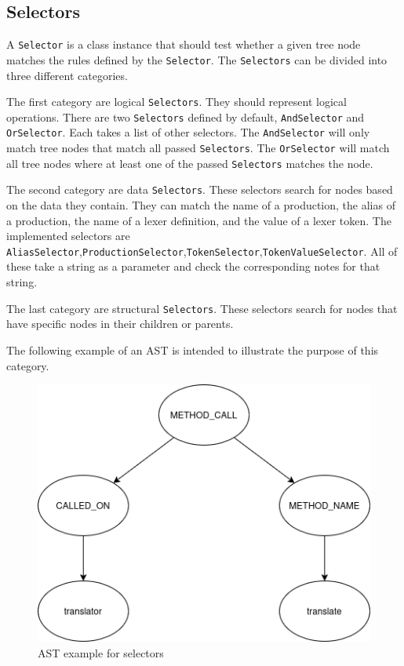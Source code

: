 
\subsection{Selectors}

A \verb|Selector| is a class instance that should test whether a given tree node matches the rules defined by the \verb|Selector|. 
The \verb|Selectors| can be divided into three different categories.

The first category are logical \verb|Selectors|. They should represent logical operations. 
There are two \verb|Selectors| defined by default, \verb|AndSelector| and \verb|OrSelector|. 
Each takes a list of other selectors. The \verb|AndSelector| will only match tree nodes that match all passed \verb|Selectors|. 
The \verb|OrSelector| will match all tree nodes where at least one of the passed \verb|Selectors| matches the node.


The second category are data \verb|Selectors|. 
These selectors search for nodes based on the data they contain. 
They can match the name of a production, the alias of a production, the name of a lexer definition, and the value of a lexer token. 
The implemented selectors are \verb|AliasSelector|,\verb|ProductionSelector|,\verb|TokenSelector|,\verb|TokenValueSelector|. 
All of these take a string as a parameter and check the corresponding notes for that string.


The last category are structural \verb|Selectors|. 
These selectors search for nodes that have specific nodes in their children or parents.

The following example of an AST is intended to illustrate the purpose of this category.

\begin{figure}[H]
    \centering
	\includegraphics[scale=0.4]{"fig/selector_ast_example.png"}
    \caption{AST example for selectors}
\end{figure}

